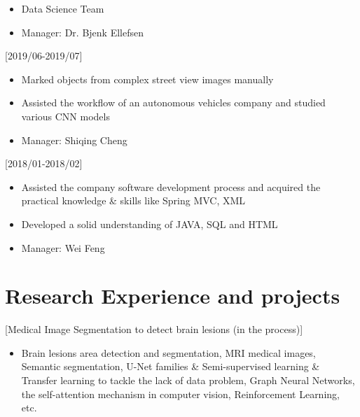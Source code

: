 \documentclass{article}
\begin{document}
\begin{itemize}
    \item Data Science Team
    \item Manager: Dr. Bjenk Ellefsen
\end{itemize}

[2019/06-2019/07]

\begin{itemize}
    \item Marked objects from complex street view images manually
    \item Assisted the workflow of an autonomous vehicles company and studied various CNN models
    \item Manager: Shiqing Cheng
\end{itemize}

[2018/01-2018/02]

\begin{itemize}
    \item Assisted the company software development process and acquired the practical knowledge \& skills like Spring MVC, XML
    \item Developed a solid understanding of JAVA, SQL and HTML
    \item Manager: Wei Feng
\end{itemize}

\section{Research Experience and projects}

[Medical Image Segmentation to detect brain lesions (in the process)]

\begin{itemize}
\item Brain lesions area detection and segmentation, MRI medical images, Semantic segmentation, U-Net families & Semi-supervised learning \& Transfer learning to tackle the lack of data problem, Graph Neural Networks, the self-attention mechanism in computer vision, Reinforcement Learning, etc.
\end{itemize}
\end{document}
